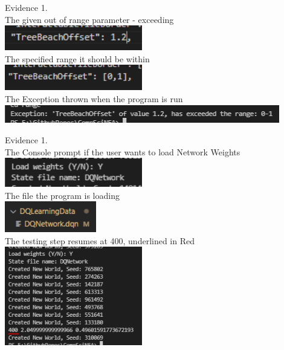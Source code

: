 \begin{flushleft}
\begin{center}
        {\large Evidence 1.\rn }\\ 
        \vspace{0.3cm}
        The given out of range parameter - exceeding \\
        \includegraphics[width=6cm]{Images/Testing/T1.4.1.PNG} \\
        The specified range it should be within \\
        \includegraphics[width=6cm]{Images/Testing/T1.4.2.PNG} \\
        The Exception thrown when the program is run \\
        \includegraphics[width=12cm]{Images/Testing/T1.4.3.PNG} \\
        \vspace{1cm}

        {\large Evidence 1.\rn }\\ 
        \vspace{0.3cm}
        The Console prompt if the user wants to load Network Weights \\
        \includegraphics[width=6cm]{Images/Testing/T1.5.1.PNG} \\
        The file the program is loading \\
        \includegraphics[width=4cm]{Images/Testing/T1.5.2.PNG} \\
        The testing step resumes at 400, underlined in Red \\
        \includegraphics[width=6cm]{Images/Testing/T1.5.3.PNG}
        \vspace{1cm}


\end{center}
\end{flushleft}
